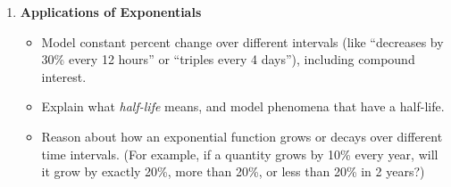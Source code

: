 \documentclass{article}
\begin{document}
\begin{enumerate}[start=16, topsep=0pt]
\begin{itemize}
\item Apply exponent rules. 
\end{itemize}

\item \textbf{Applications of Exponentials} %
\begin{itemize}
\item Model constant percent change over different intervals (like ``decreases by 30\% every 12 hours'' or ``triples every 4 days''), including compound interest.

\item Explain what \emph{half-life} means, and model phenomena that have a half-life. 

\item Reason about how an exponential function grows or decays over different time intervals. (For example, if a quantity grows by 10\% every year, will it grow by exactly 20\%, more than 20\%, or less than 20\% in 2 years?)

\end{itemize}
\end{enumerate}
\end{document}
